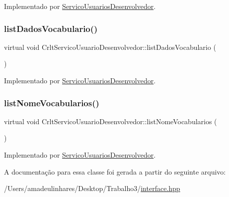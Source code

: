 Implementado por \mbox{\hyperlink{class_servico_usuarios_desenvolvedor_ad536645995beed517216ed96206ae018}{Servico\+Usuarios\+Desenvolvedor}}.

\mbox{\label{class_crlt_servico_usuario_desenvolvedor_a8fb9d062db341aa57ee44ff7b5049652}} 
\subsubsection{\texorpdfstring{list\+Dados\+Vocabulario()}{listDadosVocabulario()}}
{\footnotesize\ttfamily virtual void Crlt\+Servico\+Usuario\+Desenvolvedor\+::list\+Dados\+Vocabulario (\begin{DoxyParamCaption}{ }\end{DoxyParamCaption})\hspace{0.3cm}{\ttfamily [pure virtual]}}



Implementado por \mbox{\hyperlink{class_servico_usuarios_desenvolvedor_a5748ea9d0e56ffcad31ad486ecb8b79f}{Servico\+Usuarios\+Desenvolvedor}}.

\mbox{\label{class_crlt_servico_usuario_desenvolvedor_abb3f10c499ac67d02987f0860150393d}} 
\subsubsection{\texorpdfstring{list\+Nome\+Vocabularios()}{listNomeVocabularios()}}
{\footnotesize\ttfamily virtual void Crlt\+Servico\+Usuario\+Desenvolvedor\+::list\+Nome\+Vocabularios (\begin{DoxyParamCaption}{ }\end{DoxyParamCaption})\hspace{0.3cm}{\ttfamily [pure virtual]}}



Implementado por \mbox{\hyperlink{class_servico_usuarios_desenvolvedor_ad4f1b230cdb25ff8a2b8ae0010e99382}{Servico\+Usuarios\+Desenvolvedor}}.



A documentação para essa classe foi gerada a partir do seguinte arquivo\+:\begin{DoxyCompactItemize}
\item 
/\+Users/amadeulinhares/\+Desktop/\+Trabalho3/\mbox{\hyperlink{interface_8hpp}{interface.\+hpp}}\end{DoxyCompactItemize}
